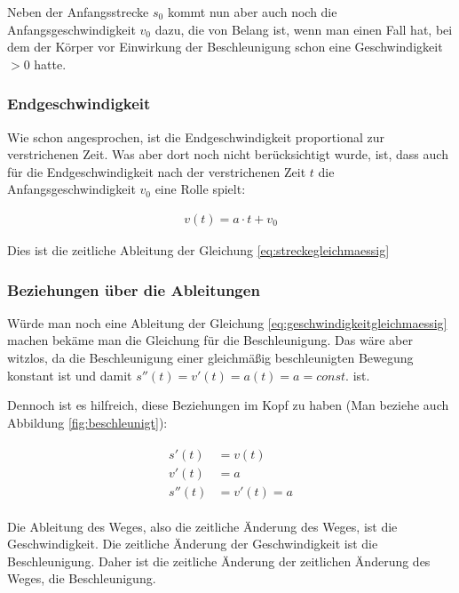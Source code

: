 \noindent Neben der Anfangsstrecke $s_0$ kommt nun aber auch noch die Anfangsgeschwindigkeit $v_0$ dazu, die von Belang ist, wenn man einen Fall hat, bei dem der Körper vor Einwirkung der Beschleunigung schon eine Geschwindigkeit $>0$ hatte.


\subsubsection{Endgeschwindigkeit}

Wie schon angesprochen, ist die Endgeschwindigkeit proportional zur verstrichenen Zeit. Was aber dort noch nicht berücksichtigt wurde, ist, dass auch für die Endgeschwindigkeit nach der verstrichenen Zeit $t$ die Anfangsgeschwindigkeit $v_0$ eine Rolle spielt:

\begin{align}	\label{eq:geschwindigkeitgleichmaessig}
	v(t) = a \cdot t + v_0
\end{align}

\noindent Dies ist die zeitliche Ableitung der Gleichung \ref{eq:streckegleichmaessig}


\subsubsection{Beziehungen über die Ableitungen}

Würde man noch eine Ableitung der Gleichung \ref{eq:geschwindigkeitgleichmaessig} machen bekäme man die Gleichung für die Beschleunigung. Das wäre aber witzlos, da die Beschleunigung einer gleichmäßig beschleunigten Bewegung konstant ist und damit $s''(t)=v'(t)=a(t)=a= const.$ ist.

Dennoch ist es hilfreich, diese Beziehungen im Kopf zu haben (Man beziehe auch Abbildung \ref{fig:beschleunigt}):

\begin{align}
\begin{split}
	s'(t) &= v(t) \\
	v'(t) &= a \\
	s''(t) &= v'(t)= a
\end{split}
\end{align}

\noindent Die Ableitung des Weges, also die zeitliche Änderung des Weges, ist die Geschwindigkeit. Die zeitliche Änderung der Geschwindigkeit ist die Beschleunigung. Daher ist die zeitliche Änderung der zeitlichen Änderung des Weges, die Beschleunigung.



